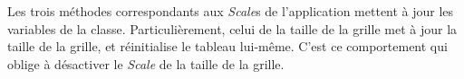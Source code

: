 \documentclass[
	12pt, %
]{fphw}
\begin{document}
\begin{problem}
	
\end{problem}
Les trois méthodes correspondants aux \textit{Scale}s de l'application mettent à jour les variables de la classe. 
Particulièrement, celui de la taille de la grille met à jour la taille de la grille, et réinitialise le tableau lui-même. C'est ce comportement qui oblige à désactiver le \textit{Scale} de la taille de la grille. 
\end{document}
